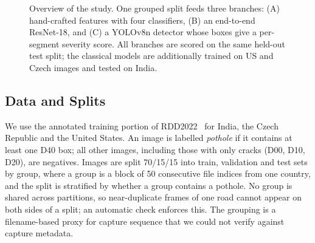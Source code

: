 \documentclass[conference]{IEEEtran}
\begin{document}
\begin{figure}[t]
{}
\caption{Overview of the study. One grouped split feeds three branches: (A) hand-crafted features with four classifiers, (B) an end-to-end ResNet-18, and (C) a YOLOv8n detector whose boxes give a per-segment severity score. All branches are scored on the same held-out test split; the classical models are additionally trained on US and Czech images and tested on India.}
\label{fig:pipeline}
\end{figure}

\subsection{Data and Splits}
We use the annotated training portion of RDD2022~\cite{arya2022rdd2022} for India, the Czech Republic and the United States. An image is labelled \emph{pothole} if it contains at least one D40 box; all other images, including those with only cracks (D00, D10, D20), are negatives. Images are split 70/15/15 into train, validation and test sets by group, where a group is a block of 50 consecutive file indices from one country, and the split is stratified by whether a group contains a pothole. No group is shared across partitions, so near-duplicate frames of one road cannot appear on both sides of a split; an automatic check enforces this. The grouping is a filename-based proxy for capture sequence that we could not verify against capture metadata.
\end{document}
